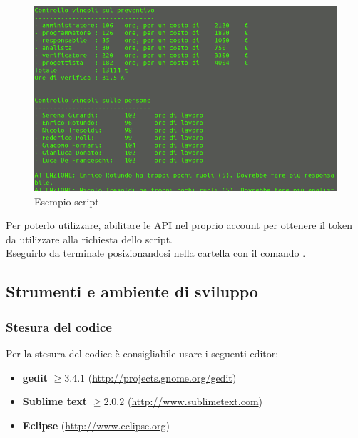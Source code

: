 \begin{figure}[H]
    \centering
    \includegraphics[scale=0.35] {ScriptGantt.png} 
    \caption{Esempio script}
\end{figure}

Per poterlo utilizzare, abilitare le API nel proprio account  per ottenere il token da utilizzare alla richiesta dello script. \\
Eseguirlo da terminale posizionandosi nella cartella  con il comando .

	\subsection{Strumenti e ambiente di sviluppo}
	\label{strumentiambientedisviluppo}
		
		\subsubsection{Stesura del codice}
		\label{editortesto}
		
		Per la stesura del codice è consigliabile usare i seguenti editor:
		\begin{itemize}
			\item \textbf{gedit} $\geq 3.4.1$ (\url{http://projects.gnome.org/gedit})
		    \item \textbf{Sublime text} $\geq 2.0.2$ (\url{http://www.sublimetext.com})
			\item \textbf{Eclipse} (\url{http://www.eclipse.org})
		\end{itemize}

